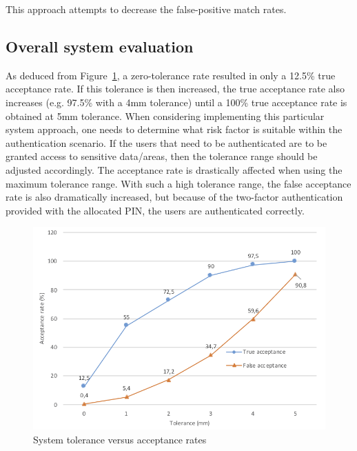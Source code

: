 This approach attempts to decrease the false-positive match rates. 


\subsection{Overall system evaluation}

As deduced from Figure~\ref{fig:System tolerance versus acceptance rates}, a zero-tolerance rate resulted in only a 12.5\% true acceptance rate. If this tolerance is then increased, the true acceptance rate also increases (e.g. 97.5\% with a 4mm tolerance) until a 100\% true acceptance rate is obtained at 5mm tolerance. 
When considering implementing this particular system approach, one needs to determine what risk factor is suitable within the authentication scenario. If the users that need to be authenticated are to be granted access to sensitive data/areas, then the tolerance range should be adjusted accordingly. The acceptance rate is drastically affected when using the maximum tolerance range. With such a high tolerance range, the false acceptance rate is also dramatically increased, but because of the two-factor authentication provided with the allocated PIN, the users are authenticated correctly.

    
    \begin{figure}[htbp!] 
    \centering    
    \includegraphics[width=1.0\textwidth]{Chapter4/Figs/Tolerance.png}
    \caption[System tolerance versus acceptance rates]{System tolerance versus acceptance rates}
    \label{fig:System tolerance versus acceptance rates}
    \end{figure}


